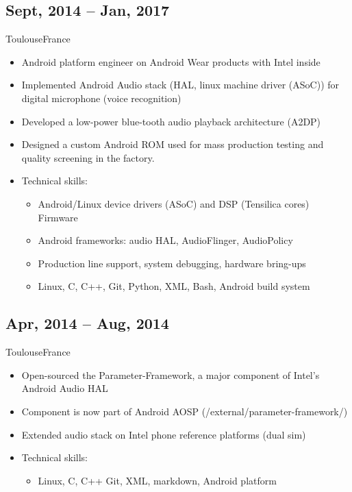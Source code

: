 \documentclass[a4paper,10pt,sans,colorlinks=true]{moderncv}
\begin{document}
\subsection{Sept, 2014 -- Jan, 2017}
{Toulouse}{France}
{
    \begin{itemize}
    \item Android platform engineer on Android Wear products with Intel inside
    \item Implemented Android Audio stack (HAL, linux machine driver (ASoC)) for digital microphone (voice recognition)
    \item Developed a low-power blue-tooth audio playback architecture (A2DP)
    \item Designed a custom Android ROM used for mass production testing and quality screening in the factory.
    \item Technical skills:
      \begin{itemize}
        \item Android/Linux device drivers (ASoC) and DSP (Tensilica cores) Firmware
        \item Android frameworks: audio HAL, AudioFlinger, AudioPolicy
        \item Production line support, system debugging, hardware bring-ups
        \item Linux, C, C++, Git, Python, XML, Bash, Android build system
      \end{itemize}
    \end{itemize}
}

\subsection{Apr, 2014 -- Aug, 2014}
{Toulouse}{France}
{
  \begin{itemize}
    \item Open-sourced the Parameter-Framework, a major component of Intel's Android Audio HAL
    \item Component is now part of Android AOSP (/external/parameter-framework/)
    \item Extended audio stack on Intel phone reference platforms (dual sim)
    \item Technical skills:
    \begin{itemize}
      \item Linux, C, C++ Git, XML, markdown, Android platform
    \end{itemize}
  \end{itemize}
}
\end{document}
